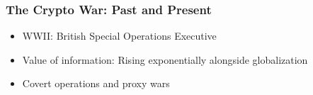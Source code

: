 \documentclass[12pt]{beamer}
\begin{document}
\begin{frame}
\frametitle{The Crypto War: Past and Present}
\begin{itemize}
\item<2-> WWII: British Special Operations Executive
\item<3-> Value of information: Rising exponentially alongside globalization
\item<4-> Covert operations and proxy wars
\end{itemize}
\begin{columns}
\begin{column}{0.5\textwidth}
\begin{center}
\end{center}
\end{column}
\begin{column}{0.5\textwidth}
\begin{center}

\end{center}
\end{column}
\end{columns}
\end{frame}
\end{document}
